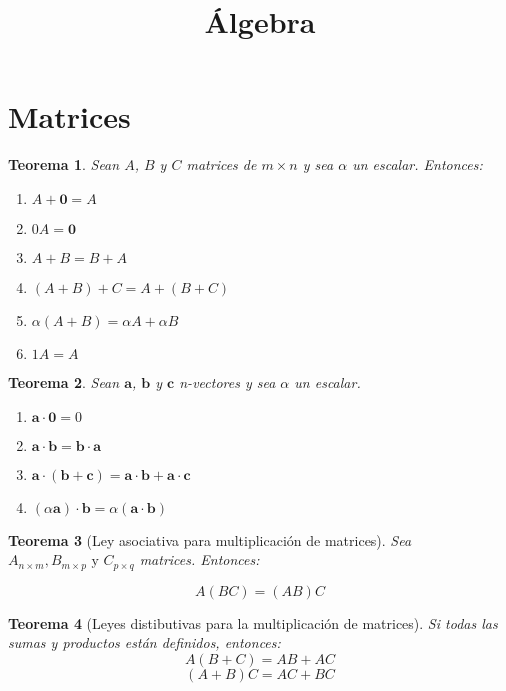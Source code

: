 \documentclass[12pt,a4paper]{extarticle}
\title{\'Algebra}
\newtheorem{teo}{Teorema}[section]
\begin{document}
\maketitle
\section{Matrices}
\begin{teo}
Sean \(A\), \(B\) y \(C\) matrices de \(m \times n\) y sea \(\alpha\)
un escalar. Entonces:
\begin{enumerate}
\item \(A + \mathbf{0} = A\)
\item \(0A = \mathbf{0}\)
\item \(A + B = B + A\)
\item \((A + B) + C = A + (B + C)\)
\item \(\alpha(A+B)=\alpha A + \alpha B\)
\item \(1A=A\)
\end{enumerate}
\end{teo}

\begin{teo}
Sean \(\mathbf{a}\), \(\mathbf{b}\) y \(\mathbf{c}\) n-vectores y sea
\(\alpha\) un escalar.
\begin{enumerate}
\item \( \mathbf{a \cdot 0} = 0 \)
\item \( \mathbf{a \cdot b} = \mathbf{b \cdot a}\)
\item \( \mathbf{a \cdot} ( \mathbf{b} + \mathbf{c}) = \mathbf{a \cdot
    b} + \mathbf{ a \cdot c}\)
\item \((\alpha \mathbf{a}) \cdot \mathbf{b} = \alpha (\mathbf{a}
  \cdot \mathbf{b})\)
\end{enumerate}
\end{teo}

\begin{teo}[Ley asociativa para multiplicaci\'on de matrices]
Sea \(A_{n \times m}, B_{m \times p} \mbox{ y }  C_{p \times q}\)
matrices. Entonces:

\[ A(BC) = (AB)C\]

\end{teo}

\begin{teo}[Leyes distibutivas para la multiplicaci\'on de matrices]
Si todas las sumas y productos est\'an definidos, entonces:
\[A(B+C)=AB+AC \]
\[(A+B)C=AC+BC \]
\end{teo}
\vspace{.25cm}
\end{document}
